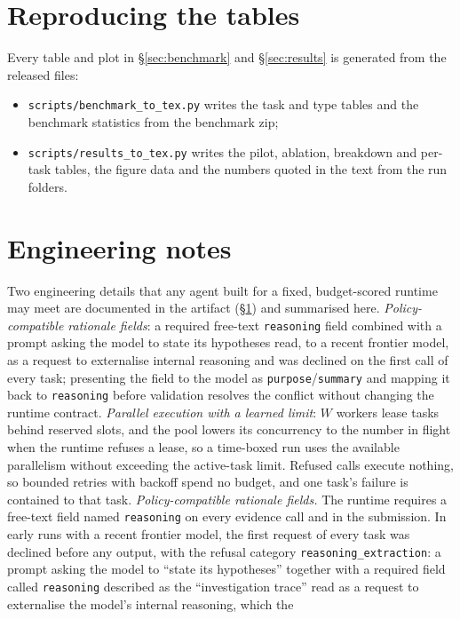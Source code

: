 \section{Reproducing the tables}
\label{app:repro}
Every table and plot in \S\ref{sec:benchmark} and \S\ref{sec:results} is generated from the released files:
\begin{itemize}
\item \texttt{scripts/benchmark\_to\_tex.py} writes the task and type tables and the benchmark statistics from
the benchmark zip;
\item \texttt{scripts/results\_to\_tex.py} writes the pilot, ablation, breakdown and per-task tables, the
figure data and the numbers quoted in the text from the run folders.
\end{itemize}
\fi

\section{Engineering notes}
\label{app:engineering}
\ifconf
Two engineering details that any agent built for a fixed, budget-scored runtime may meet are documented in the
artifact (\S\ref{app:repro}) and summarised here. \emph{Policy-compatible rationale fields}: a required
free-text \texttt{reasoning} field combined with a prompt asking the model to state its hypotheses read, to a
recent frontier model, as a request to externalise internal reasoning and was declined on the first call of
every task; presenting the field to the model as \texttt{purpose}/\texttt{summary} and mapping it back to
\texttt{reasoning} before validation resolves the conflict without changing the runtime contract.
\emph{Parallel execution with a learned limit}: $W$ workers lease tasks behind reserved slots, and the pool
lowers its concurrency to the number in flight when the runtime refuses a lease, so a time-boxed run uses the
available parallelism without exceeding the active-task limit. Refused calls execute nothing, so bounded retries
with backoff spend no budget, and one task's failure is contained to that task.
\else
\emph{Policy-compatible rationale fields.} The runtime requires a free-text field named \texttt{reasoning} on
every evidence call and in the submission. In early runs with a recent frontier model, the first request of
every task was declined before any output, with the refusal category \texttt{reasoning\_extraction}: a prompt
asking the model to ``state its hypotheses'' together with a required field called \texttt{reasoning} described
as the ``investigation trace'' read as a request to externalise the model's internal reasoning, which the
